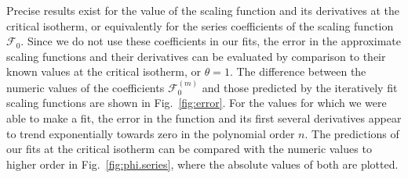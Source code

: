 \documentclass[
aps,
pre,
preprint,
longbibliography,
floatfix
]{revtex4-2}
\begin{document}
Precise results exist for the value of the scaling function and its derivatives
at the critical isotherm, or equivalently for the series coefficients of the
scaling function $\mathcal F_0$. Since we do not use these coefficients in our
fits, the error in the approximate scaling functions and their derivatives can
be evaluated by comparison to their known values at the critical isotherm, or
$\theta=1$.  The difference between the numeric values of the coefficients
$\mathcal F_0^{(m)}$ and those predicted by the iteratively fit scaling
functions are shown in Fig.~\ref{fig:error}. For the values for which we were
able to make a fit, the error in the function and its first several derivatives
appear to trend exponentially towards zero in the polynomial order $n$. The
predictions of our fits at the critical isotherm can be compared with the
numeric values to higher order in Fig.~\ref{fig:phi.series}, where the absolute
values of both are plotted.
\end{document}
